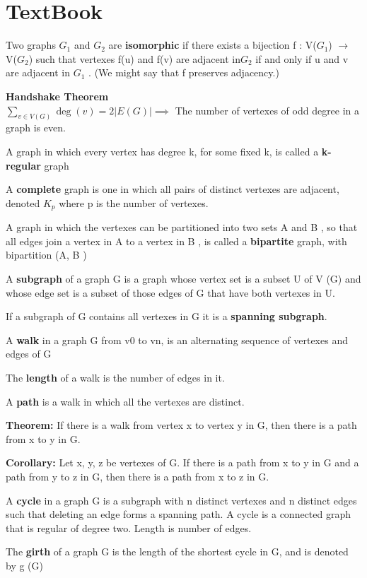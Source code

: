 \documentclass[12pt]{article}
\begin{document}
\section*{TextBook}

Two graphs $G_1$ and $G_2$ are \textbf{isomorphic} if there exists a bijection f : V($G_1$) $\rightarrow$ V($G_2$) such that vertexes f(u) and f(v) are adjacent in$G_2$ if and only if u and v are adjacent in $G_1$ . (We might say that f preserves adjacency.)

\textbf{Handshake Theorem}\\
$\displaystyle\sum_{v\in V(G)} \deg(v) = 2|E(G)| \implies$ The number of vertexes of odd degree in a graph is even.

A graph in which every vertex has degree k, for some fixed k, is called a \textbf{k-regular} graph

A \textbf{complete} graph is one in which all pairs of distinct vertexes are adjacent, denoted $K_p$ where p is the number of vertexes.

A graph in which the vertexes can be partitioned into two sets A and B , so that all edges join a vertex in A to a vertex in B , is called a \textbf{bipartite} graph, with bipartition (A, B )

A \textbf{subgraph} of a graph G is a graph whose vertex set is a subset U of V (G) and whose edge set is a subset of those edges of G that have both vertexes in U.

If a subgraph of G contains all vertexes in G it is a \textbf{spanning subgraph}.

A \textbf{walk} in a graph G from v0 to vn, is an alternating sequence of vertexes and edges of G

The \textbf{length} of a walk is the number of edges in it.

A \textbf{path} is a walk in which all the vertexes are distinct.

\textbf{Theorem:} If there is a walk from vertex x to vertex y in G, then there is a path from x to y in G.

\textbf{Corollary:} Let x, y, z be vertexes of G. If there is a path from x to y in G and a path from y to z in G, then there is a path from x to z in G.

A \textbf{cycle} in a graph G is a subgraph with n distinct vertexes and n distinct edges such that deleting an edge forms a spanning path. A cycle is a connected graph that is regular of degree two. Length is number of edges.

The \textbf{girth} of a graph G is the length of the shortest cycle in G, and is denoted by g (G)
\end{document}
